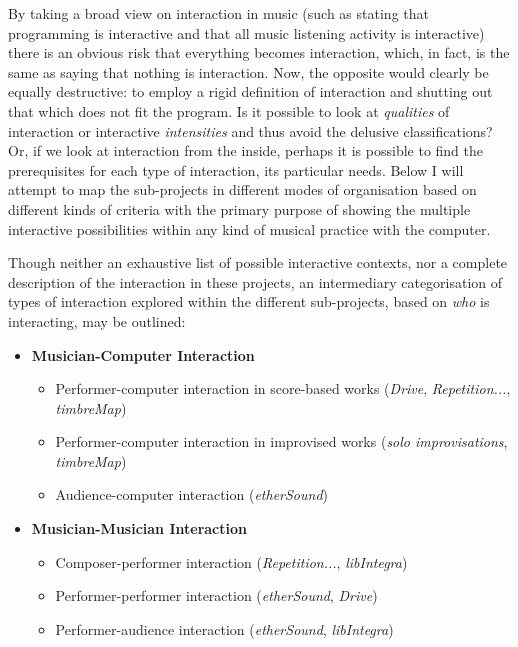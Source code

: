 By taking a broad view on interaction in music (such as stating that programming is interactive and that all music listening activity is interactive) there is an obvious risk that everything becomes interaction, which, in fact, is the same as saying that nothing is interaction. Now, the opposite would clearly be equally destructive: to employ a rigid definition of interaction and shutting out that which does not fit the program. Is it possible to look at \emph{qualities} of interaction or interactive \emph{intensities} and thus avoid the delusive classifications? Or, if we look at interaction from the inside, perhaps it is possible to find the prerequisites for each type of interaction, its particular needs. Below I will attempt to map the sub-projects in different modes of organisation based on different kinds of criteria with the primary purpose of showing the multiple interactive possibilities within any kind of musical practice with the computer. 

Though neither an exhaustive list of possible interactive contexts, nor a complete description of the interaction in these projects, an intermediary categorisation of types of interaction explored within the different sub-projects, based on \emph{who} is interacting, may be outlined:

\begin{itemize}

\item \textbf{Musician-Computer Interaction}
  \begin{itemize}
  \item Performer-computer interaction in score-based works   (\emph{Drive}, \emph{Repetition...}, \emph{timbreMap})

  \item Performer-computer interaction in improvised works (\emph{solo improvisations}, \emph{timbreMap})

\item Audience-computer interaction (\emph{etherSound})

  \end{itemize}

\item \textbf{Musician-Musician Interaction}
  \begin{itemize}

  \item Composer-performer interaction (\emph{Repetition...}, \emph{libIntegra})

  \item Performer-performer interaction (\emph{etherSound}, \emph{Drive})

  \item Performer-audience interaction (\emph{etherSound}, \emph{libIntegra})
  \end{itemize}
\end{itemize}

